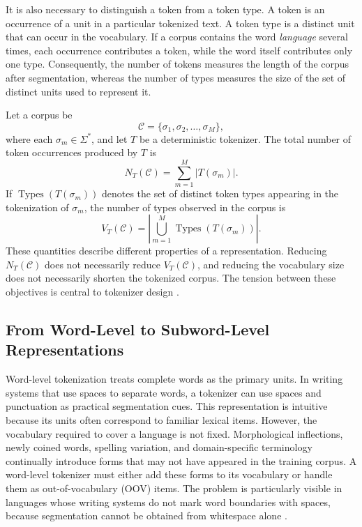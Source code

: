 It is also necessary to distinguish a token from a token type. A token is an occurrence of a unit in a particular tokenized text. A token type is a distinct unit that can occur in the vocabulary. If a corpus contains the word \emph{language} several times, each occurrence contributes a token, while the word itself contributes only one type. Consequently, the number of tokens measures the length of the corpus after segmentation, whereas the number of types measures the size of the set of distinct units used to represent it.

Let a corpus be
\[
    \mathcal{C}=\{\sigma_1,\sigma_2,\ldots,\sigma_M\},
\]
where each \(\sigma_m\in\Sigma^*\), and let \(T\) be a deterministic tokenizer. The total number of token occurrences produced by \(T\) is
\begin{equation}
    N_T(\mathcal{C})
    =
    \sum_{m=1}^{M}|T(\sigma_m)|.
    \label{eq:tokenizer-token-count}
\end{equation}
If \(\operatorname{Types}(T(\sigma_m))\) denotes the set of distinct token types appearing in the tokenization of \(\sigma_m\), the number of types observed in the corpus is
\begin{equation}
    V_T(\mathcal{C})
    =
    \left|
    \bigcup_{m=1}^{M}\operatorname{Types}(T(\sigma_m))
    \right|.
    \label{eq:tokenizer-type-count}
\end{equation}
These quantities describe different properties of a representation. Reducing \(N_T(\mathcal{C})\) does not necessarily reduce \(V_T(\mathcal{C})\), and reducing the vocabulary size does not necessarily shorten the tokenized corpus. The tension between these objectives is central to tokenizer design \parencite{yang2024rethinking}.

\subsection{From Word-Level to Subword-Level Representations}
\label{subsec:tokenizer-representation-families}

Word-level tokenization treats complete words as the primary units. In writing systems that use spaces to separate words, a tokenizer can use spaces and punctuation as practical segmentation cues. This representation is intuitive because its units often correspond to familiar lexical items. However, the vocabulary required to cover a language is not fixed. Morphological inflections, newly coined words, spelling variation, and domain-specific terminology continually introduce forms that may not have appeared in the training corpus. A word-level tokenizer must either add these forms to its vocabulary or handle them as out-of-vocabulary (OOV) items. The problem is particularly visible in languages whose writing systems do not mark word boundaries with spaces, because segmentation cannot be obtained from whitespace alone \parencite{yang2024rethinking}.

